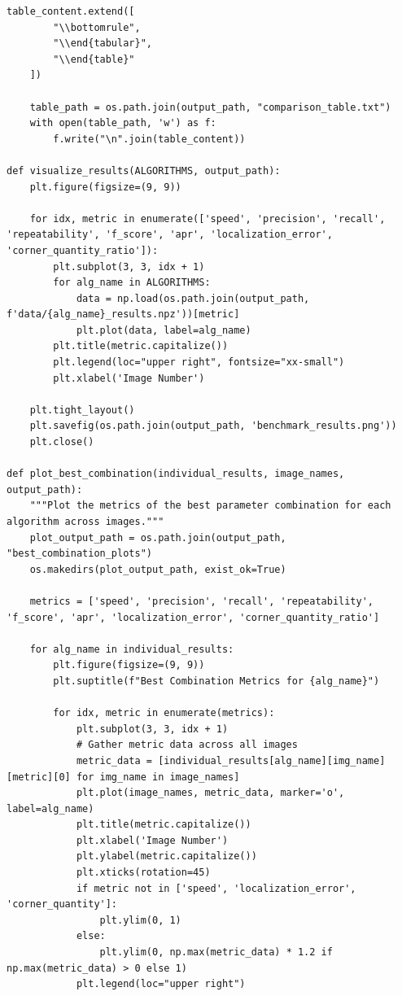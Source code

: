 \documentclass[journal]{IEEEtran}
\begin{document}
\begin{lstlisting}[style=python, caption={Utility Functions for Data Processing}, label={lst:utilities}]
    table_content.extend([
        "\\bottomrule",
        "\\end{tabular}",
        "\\end{table}"
    ])
    
    table_path = os.path.join(output_path, "comparison_table.txt")
    with open(table_path, 'w') as f:
        f.write("\n".join(table_content))

def visualize_results(ALGORITHMS, output_path):
    plt.figure(figsize=(9, 9))
    
    for idx, metric in enumerate(['speed', 'precision', 'recall', 'repeatability', 'f_score', 'apr', 'localization_error', 'corner_quantity_ratio']):
        plt.subplot(3, 3, idx + 1)
        for alg_name in ALGORITHMS:
            data = np.load(os.path.join(output_path, f'data/{alg_name}_results.npz'))[metric]
            plt.plot(data, label=alg_name)
        plt.title(metric.capitalize())
        plt.legend(loc="upper right", fontsize="xx-small")
        plt.xlabel('Image Number')
    
    plt.tight_layout()
    plt.savefig(os.path.join(output_path, 'benchmark_results.png'))
    plt.close()

def plot_best_combination(individual_results, image_names, output_path):
    """Plot the metrics of the best parameter combination for each algorithm across images."""
    plot_output_path = os.path.join(output_path, "best_combination_plots")
    os.makedirs(plot_output_path, exist_ok=True)
    
    metrics = ['speed', 'precision', 'recall', 'repeatability', 'f_score', 'apr', 'localization_error', 'corner_quantity_ratio']
    
    for alg_name in individual_results:
        plt.figure(figsize=(9, 9))
        plt.suptitle(f"Best Combination Metrics for {alg_name}")
        
        for idx, metric in enumerate(metrics):
            plt.subplot(3, 3, idx + 1)
            # Gather metric data across all images
            metric_data = [individual_results[alg_name][img_name][metric][0] for img_name in image_names]
            plt.plot(image_names, metric_data, marker='o', label=alg_name)
            plt.title(metric.capitalize())
            plt.xlabel('Image Number')
            plt.ylabel(metric.capitalize())
            plt.xticks(rotation=45)
            if metric not in ['speed', 'localization_error', 'corner_quantity']:
                plt.ylim(0, 1)
            else:
                plt.ylim(0, np.max(metric_data) * 1.2 if np.max(metric_data) > 0 else 1)
            plt.legend(loc="upper right")
        

\end{lstlisting}
\end{document}
